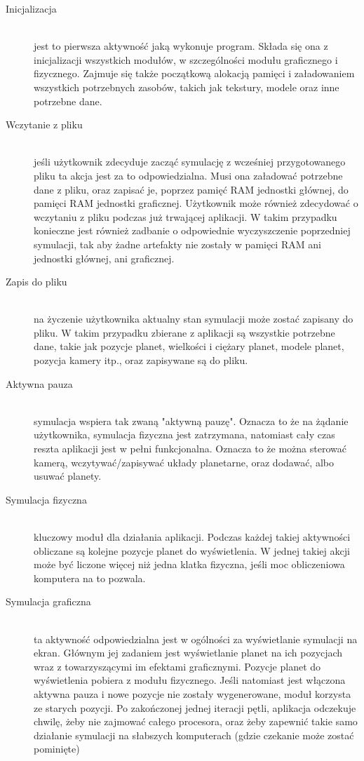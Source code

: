\begin{description}
	\item[Inicjalizacja] \hfill \\
	jest to pierwsza aktywność jaką wykonuje program. Składa się ona z inicjalizacji wszystkich modułów, w szczególności modułu graficznego i fizycznego. Zajmuje się także początkową alokacją pamięci i załadowaniem wszystkich potrzebnych zasobów, takich jak tekstury, modele oraz inne potrzebne dane.
	\item[Wczytanie z pliku] \hfill \\
	jeśli użytkownik zdecyduje zacząć symulację z wcześniej przygotowanego pliku ta akcja jest za to odpowiedzialna. Musi ona załadować potrzebne dane z pliku, oraz zapisać je, poprzez pamięć RAM jednostki głównej, do pamięci RAM jednostki graficznej. Użytkownik może również zdecydować o wczytaniu z pliku podczas już trwającej aplikacji. W takim przypadku konieczne jest również zadbanie o odpowiednie wyczyszczenie poprzedniej symulacji, tak aby żadne artefakty nie zostały w pamięci RAM ani jednostki głównej, ani graficznej.
	\item[Zapis do pliku] \hfill \\
	na życzenie użytkownika aktualny stan symulacji może zostać zapisany do pliku. W takim przypadku zbierane z aplikacji są wszystkie potrzebne dane, takie jak pozycje planet, wielkości i ciężary planet, modele planet, pozycja kamery itp., oraz zapisywane są do pliku.
	\item[Aktywna pauza] \hfill \\
	symulacja wspiera tak zwaną "aktywną pauzę". Oznacza to że na żądanie użytkownika, symulacja fizyczna jest zatrzymana, natomiast cały czas reszta aplikacji jest w pełni funkcjonalna. Oznacza to że można sterować kamerą, wczytywać/zapisywać układy planetarne, oraz dodawać, albo usuwać planety.
	\item[Symulacja fizyczna] \hfill \\
	kluczowy moduł dla działania aplikacji. Podczas każdej takiej aktywności obliczane są kolejne pozycje planet do wyświetlenia. W jednej takiej akcji może być liczone więcej niż jedna klatka fizyczna, jeśli moc obliczeniowa komputera na to pozwala.
	\item[Symulacja graficzna] \hfill \\
	ta aktywność odpowiedzialna jest w ogólności za wyświetlanie symulacji na ekran. Głównym jej zadaniem jest wyświetlanie planet na ich pozycjach wraz z towarzyszącymi im efektami graficznymi. Pozycje planet do wyświetlenia pobiera z modułu fizycznego. Jeśli natomiast jest włączona aktywna pauza i nowe pozycje nie zostały wygenerowane, moduł korzysta ze starych pozycji. Po zakończonej jednej iteracji pętli, aplikacja odczekuje chwilę, żeby nie zajmować całego procesora, oraz żeby zapewnić takie samo działanie symulacji na słabszych komputerach (gdzie czekanie może zostać pominięte)
\end{description}

